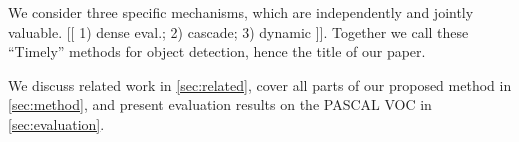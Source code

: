 We consider three specific mechanisms, which are independently and jointly valuable.
[[ 1) dense eval.; 2) cascade; 3) dynamic ]].
Together we call these ``Timely'' methods for object detection, hence the title of our paper.

We discuss related work in \autoref{sec:related}, cover all parts of our proposed method in \autoref{sec:method}, and present evaluation results on the PASCAL VOC in \autoref{sec:evaluation}.
